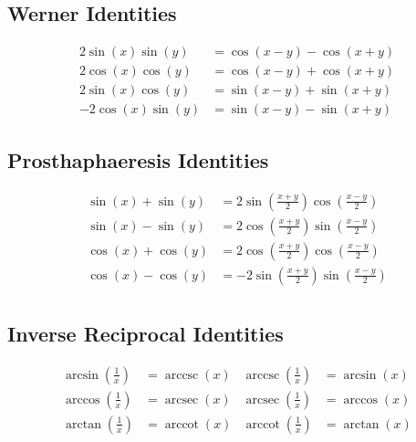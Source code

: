 \documentclass{article}
\DeclareMathOperator{\arccot}{arccot}
\DeclareMathOperator{\arcsec}{arcsec}
\DeclareMathOperator{\arccsc}{arccsc}
\begin{document}
\subsection{Werner Identities}
\begin{align*}
    2\sin{\left( x \right)}\sin{\left( y \right)}  & = \cos{\left( x-y \right)}-\cos{\left( x+y \right)} \\
    2\cos{\left( x \right)}\cos{\left( y \right)}  & = \cos{\left( x-y \right)}+\cos{\left( x+y \right)} \\
    2\sin{\left( x \right)}\cos{\left( y \right)}  & = \sin{\left( x-y \right)}+\sin{\left( x+y \right)} \\
    -2\cos{\left( x \right)}\sin{\left( y \right)} & = \sin{\left( x-y \right)}-\sin{\left( x+y \right)}
\end{align*}
\subsection{Prosthaphaeresis Identities}
\begin{align*}
    \sin{\left( x \right)}+\sin{\left( y \right)} & = 2\sin{\left(\frac{x+y}{2} \right)}\cos{\left( \frac{x-y}{2} \right)}  \\
    \sin{\left( x \right)}-\sin{\left( y \right)} & = 2\cos{\left(\frac{x+y}{2} \right)}\sin{\left( \frac{x-y}{2} \right)}  \\
    \cos{\left( x \right)}+\cos{\left( y \right)} & = 2\cos{\left(\frac{x+y}{2} \right)}\cos{\left( \frac{x-y}{2} \right)}  \\
    \cos{\left( x \right)}-\cos{\left( y \right)} & = -2\sin{\left(\frac{x+y}{2} \right)}\sin{\left( \frac{x-y}{2} \right)} \\
\end{align*}
\subsection{Inverse Reciprocal Identities}
\begin{align*}
    \arcsin{\left( \frac{1}{x} \right)} & = \arccsc{\left( x \right)} & \arccsc{\left( \frac{1}{x} \right)} & = \arcsin{\left( x \right)} \\
    \arccos{\left( \frac{1}{x} \right)} & = \arcsec{\left( x \right)} & \arcsec{\left( \frac{1}{x} \right)} & = \arccos{\left( x \right)} \\
    \arctan{\left( \frac{1}{x} \right)} & = \arccot{\left( x \right)} & \arccot{\left( \frac{1}{x} \right)} & = \arctan{\left( x \right)} \\
\end{align*}
\end{document}
